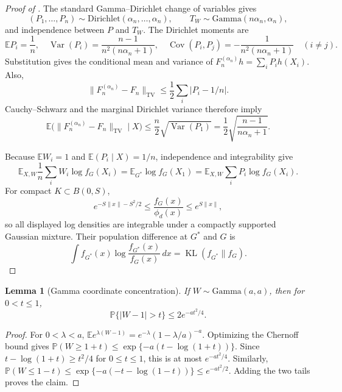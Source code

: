 \documentclass[11pt]{article}
\newtheorem{lemma}[theorem]{Lemma}
\theoremstyle{definition}
\theoremstyle{remark}
\DeclareMathOperator{\KL}{KL}
\DeclareMathOperator{\TV}{TV}
\newcommand{\EE}{\mathbb E}
\newcommand{\PP}{\mathbb P}
\newcommand{\norm}[1]{\lVert #1\rVert}
\newcommand{\abs}[1]{\lvert #1\rvert}
\begin{document}
\begin{proof}[Proof of ]
The standard Gamma--Dirichlet change of variables gives
\[
 (P_1,\ldots,P_n)\sim\mathrm{Dirichlet}(\alpha_n,\ldots,\alpha_n),
 \qquad T_W\sim\mathrm{Gamma}(n\alpha_n,\alpha_n),
\]
and independence between $P$ and $T_W$.  The Dirichlet moments are
\[
 \EE P_i=\frac1n,
 \quad
 \operatorname{Var}(P_i)=\frac{n-1}{n^2(n\alpha_n+1)},
 \quad
 \operatorname{Cov}(P_i,P_j)=-\frac1{n^2(n\alpha_n+1)}\quad(i\ne j).
\]
Substitution gives the conditional mean and variance of
$F_n^{(\alpha_n)}h=\sum_iP_ih(X_i)$.  Also,
\[
 \norm{F_n^{(\alpha_n)}-F_n}_{\TV}
 \le\frac12\sum_i\abs{P_i-1/n}.
\]
Cauchy--Schwarz and the marginal Dirichlet variance therefore imply
\[
 \EE\bigl(\norm{F_n^{(\alpha_n)}-F_n}_{\TV}\mid X\bigr)
 \le\frac n2\sqrt{\operatorname{Var}(P_1)}
 =\frac12\sqrt{\frac{n-1}{n\alpha_n+1}}.
\]

Because $\EE W_i=1$ and $\EE(P_i\mid X)=1/n$, independence and
integrability give
\[
 \EE_{X,W}\frac1n\sum_iW_i\log f_G(X_i)
 =\EE_{G^*}\log f_G(X_1)
 =\EE_{X,W}\sum_iP_i\log f_G(X_i).
\]
For compact $K\subset B(0,S)$,
\[
 e^{-S\norm{x}-S^2/2}
 \le\frac{f_G(x)}{\phi_d(x)}\le e^{S\norm{x}},
\]
so all displayed log densities are integrable under a compactly supported
Gaussian mixture.  Their population difference at $G^*$ and $G$ is
\[
 \int f_{G^*}(x)\log\frac{f_{G^*}(x)}{f_G(x)}\,dx
 =\KL(f_{G^*}\|f_G).
\]
\end{proof}

\begin{lemma}[Gamma coordinate concentration]
\label{lem:gamma-concentration}
If $W\sim\mathrm{Gamma}(a,a)$, then for $0<t\le1$,
\[
 \PP\{\abs{W-1}>t\}\le2e^{-at^2/4}.
\]
\end{lemma}

\begin{proof}
For $0<\lambda<a$,
$\EE e^{\lambda(W-1)}=e^{-\lambda}(1-\lambda/a)^{-a}$.  Optimizing the
Chernoff bound gives
$\PP(W\ge1+t)\le\exp\{-a(t-\log(1+t))\}$.  Since
$t-\log(1+t)\ge t^2/4$ for $0\le t\le1$, this is at most $e^{-at^2/4}$.
Similarly,
$\PP(W\le1-t)\le\exp\{-a(-t-\log(1-t))\}\le e^{-at^2/2}$.
Adding the two tails proves the claim.
\end{proof}
\end{document}
